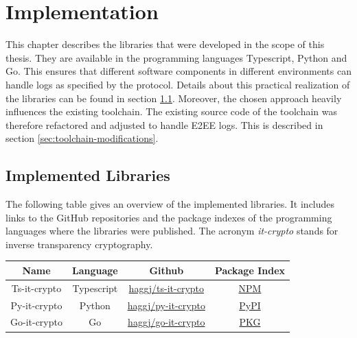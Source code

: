 \documentclass[../main.tex]{subfiles}
\begin{document}
\chapter{Implementation}
\label{chap:implementation}

This chapter describes the libraries that were developed in the scope of this thesis.
They are available in the programming languages Typescript, Python and Go.
This ensures that different software components in different environments can handle logs as specified by the protocol.
Details about this practical realization of the libraries can be found in section \ref{sec:implemented-libraries}.
Moreover, the chosen approach heavily influences the existing toolchain.
The existing source code of the toolchain was therefore refactored and adjusted to handle E2EE logs.
This is described in section \ref{sec:toolchain-modifications}.

\section{Implemented Libraries}
\label{sec:implemented-libraries}

The following table gives an overview of the implemented libraries.
It includes links to the GitHub repositories and the package indexes of the programming languages where the libraries were published.
The acronym \textit{it-crypto} stands for inverse transparency cryptography.

\begin{table}[ht]
    \centering
    \begin{tabular}{|c|c|c|c|}
    \hline
    Name         & Language & Github                           & Package Index                                    \\ \hline
    Ts-it-crypto & Typescript           & \href{https://github.com/haggj/ts-it-crypto}{haggj/ts-it-crypto} & \href{https://www.npmjs.com/package/ts-it-crypto}{NPM}       \\ \hline
    Py-it-crypto & Python               & \href{https://github.com/haggj/py-it-crypto}{haggj/py-it-crypto} & \href{https://pypi.org/project/py-it-crypto/}{PyPI}          \\ \hline
    Go-it-crypto & Go                   & \href{https://github.com/haggj/go-it-crypto}{haggj/go-it-crypto} & \href{https://pkg.go.dev/github.com/haggj/go-it-crypto}{PKG} \\ \hline
    \end{tabular}
\end{table}
\end{document}

